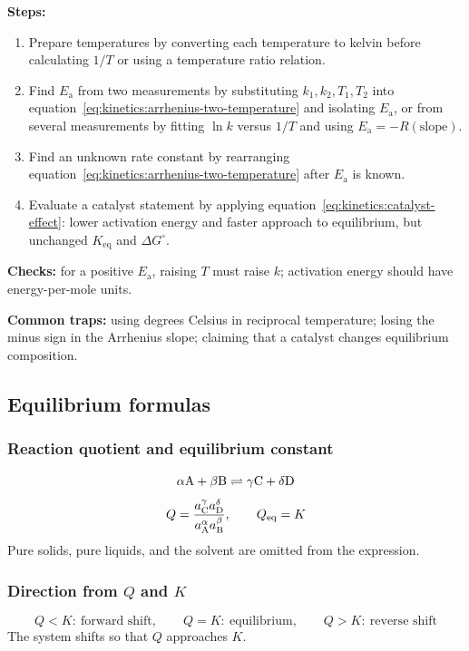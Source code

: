 \textbf{Steps:}
\begin{enumerate}
    \item Prepare temperatures by converting each temperature to kelvin before calculating \(1/T\) or using a temperature ratio relation.
    \item Find \(E_{\mathrm a}\) from two measurements by substituting \(k_1,k_2,T_1,T_2\) into equation~\eqref{eq:kinetics:arrhenius-two-temperature} and isolating \(E_{\mathrm a}\), or from several measurements by fitting \(\ln k\) versus \(1/T\) and using \(E_{\mathrm a}=-R(\text{slope})\).
    \item Find an unknown rate constant by rearranging equation~\eqref{eq:kinetics:arrhenius-two-temperature} after \(E_{\mathrm a}\) is known.
    \item Evaluate a catalyst statement by applying equation~\eqref{eq:kinetics:catalyst-effect}: lower activation energy and faster approach to equilibrium, but unchanged \(K_{\mathrm{eq}}\) and \(\Delta G^\circ\).
\end{enumerate}

\textbf{Checks:} for a positive \(E_{\mathrm a}\), raising \(T\) must raise \(k\); activation energy should have energy-per-mole units.

\textbf{Common traps:} using degrees Celsius in reciprocal temperature; losing the minus sign in the Arrhenius slope; claiming that a catalyst changes equilibrium composition.

\subsection{Equilibrium formulas}

\subsubsection{Reaction quotient and equilibrium constant}
\begin{equation}
\alpha\ce{A}+\beta\ce{B}\rightleftharpoons\gamma\ce{C}+\delta\ce{D}
\label{eq:kinetics:equilibrium-reaction}
\end{equation}
\begin{equation}
Q=\frac{a_{\ce{C}}^\gamma a_{\ce{D}}^\delta}{a_{\ce{A}}^\alpha a_{\ce{B}}^\beta},
\qquad Q_{\mathrm{eq}}=K
\label{eq:kinetics:reaction-quotient}
\end{equation}
Pure solids, pure liquids, and the solvent are omitted from the expression.

\subsubsection{Direction from \(Q\) and \(K\)}
\begin{equation}
Q<K:\ \text{forward shift}, \qquad
Q=K:\ \text{equilibrium}, \qquad
Q>K:\ \text{reverse shift}
\label{eq:kinetics:q-versus-k}
\end{equation}
The system shifts so that \(Q\) approaches \(K\).


